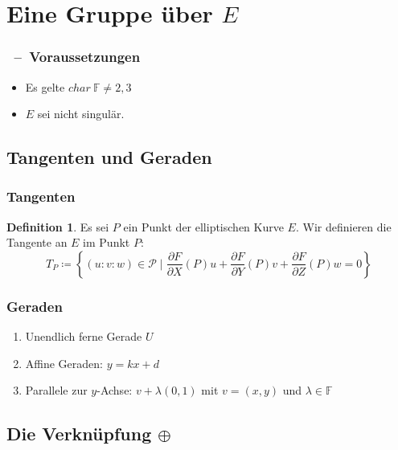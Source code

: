 \documentclass{beamer}
\theoremstyle{plain}
\theoremstyle{definition}
\newtheorem{defn}[thm]{Definition}
\theoremstyle{rem}
\begin{document}
\section{Eine Gruppe über $E$}

\begin{frame}
\frametitle{\insertsection~--~Voraussetzungen}
\begin{itemize}
    \item Es gelte $char\ \mathbb{F}\ne2,3$
    \item $E$ sei nicht singulär.
\end{itemize}
\end{frame}

\subsection{Tangenten und Geraden}

\begin{frame}
\frametitle{Tangenten}
\begin{defn}
    Es sei $P$ ein Punkt der elliptischen Kurve $E$. Wir definieren die Tangente an $E$ im Punkt $P$:
    \begin{equation*}
        T_P\coloneqq\left\{(u:v:w)\in\mathcal{P}\mid\frac{\partial F}{\partial X}(P)u+\frac{\partial F}{\partial Y}(P)v+\frac{\partial F}{\partial Z}(P)w=0\right\}
    \end{equation*}
\end{defn}
\end{frame}

\begin{frame}
    \frametitle{Geraden}
    \begin{enumerate}[<+->]
        \item Unendlich ferne Gerade $U$
        \item Affine Geraden: $y = kx +d$
        \item Parallele zur $y$-Achse: $v + \lambda (0,1)$ mit $v=(x,y)$ und $\lambda \in \mathbb{F}$
    \end{enumerate}
\end{frame}

\subsection{Die Verknüpfung $\oplus$}
\end{document}
